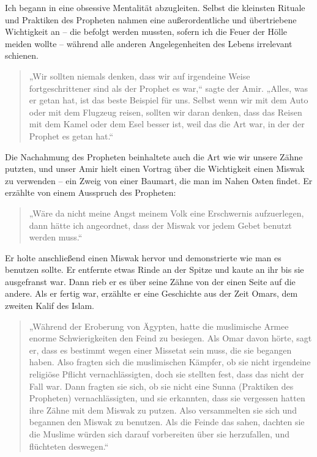 \documentclass[12pt]{memoir}
\begin{document}
Ich begann in eine obsessive Mentalität abzugleiten.
Selbst die kleinsten Rituale und Praktiken des Propheten
nahmen eine außerordentliche und übertriebene Wichtigkeit an –
die befolgt werden mussten, sofern ich die Feuer der Hölle meiden wollte –
während alle anderen Angelegenheiten des Lebens irrelevant schienen.

\begin{quote}
„Wir sollten niemals denken,
dass wir auf irgendeine Weise fortgeschrittener sind als der Prophet es war,“
sagte der Amir.
„Alles, was er getan hat, ist das beste Beispiel für uns.
Selbst wenn wir mit dem Auto oder mit dem Flugzeug reisen,
sollten wir daran denken,
dass das Reisen mit dem Kamel oder dem Esel besser ist,
weil das die Art war, in der der Prophet es getan hat.“
\end{quote}

Die Nachahmung des Propheten beinhaltete auch die Art
wie wir unsere Zähne putzten,
und unser Amir hielt einen Vortrag über die Wichtigkeit
einen Miswak zu verwenden – ein Zweig von einer Baumart,
die man im Nahen Osten findet.
Er erzählte von einem Ausspruch des Propheten:

\begin{quote}
„Wäre da nicht meine Angst meinem Volk eine Erschwernis aufzuerlegen,
dann hätte ich angeordnet,
dass der Miswak vor jedem Gebet benutzt werden muss.“
\end{quote}

Er holte anschließend einen Miswak hervor und demonstrierte
wie man es benutzen sollte.
Er entfernte etwas Rinde an der Spitze
und kaute an ihr bis sie ausgefranst war.
Dann rieb er es über seine Zähne von der einen Seite auf die andere.
Als er fertig war, erzählte er eine Geschichte aus der Zeit Omars,
dem zweiten Kalif des Islam.

\begin{quote}
„Während der Eroberung von Ägypten,
hatte die muslimische Armee enorme Schwierigkeiten den Feind zu besiegen.
Als Omar davon hörte, sagt er, dass es bestimmt wegen einer Missetat sein muss,
die sie begangen haben.
Also fragten sich die muslimischen Kämpfer,
ob sie nicht irgendeine religiöse Pflicht vernachlässigten,
doch sie stellten fest, dass das nicht der Fall war.
Dann fragten sie sich, ob sie nicht eine Sunna
(Praktiken des Propheten) vernachlässigten, und sie erkannten,
dass sie vergessen hatten ihre Zähne mit dem Miswak zu putzen.
Also versammelten sie sich und begannen den Miswak zu benutzen.
Als die Feinde das sahen, dachten sie die Muslime würden sich
darauf vorbereiten über sie herzufallen, und flüchteten deswegen.“
\end{quote}
\end{document}
